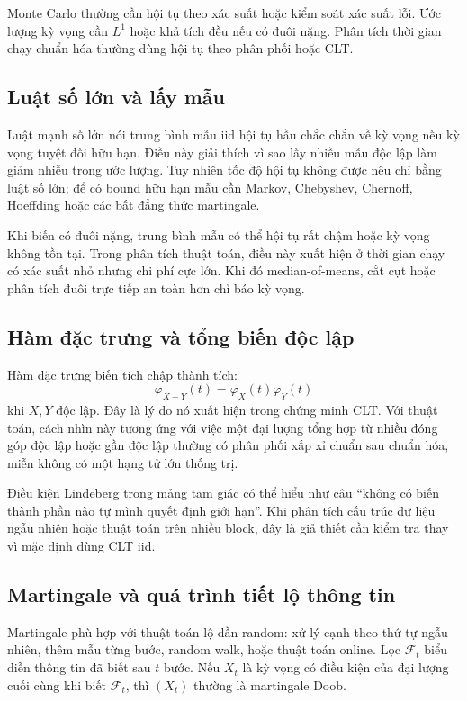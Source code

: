 \documentclass[11pt]{article}
\begin{document}
Monte Carlo thường cần hội tụ theo xác suất hoặc kiểm soát xác suất lỗi. Ước
lượng kỳ vọng cần \(L^1\) hoặc khả tích đều nếu có đuôi nặng. Phân tích thời
gian chạy chuẩn hóa thường dùng hội tụ theo phân phối hoặc CLT.

\subsection{Luật số lớn và lấy mẫu}

Luật mạnh số lớn nói trung bình mẫu iid hội tụ hầu chắc chắn về kỳ vọng nếu
kỳ vọng tuyệt đối hữu hạn. Điều này giải thích vì sao lấy nhiều mẫu độc lập làm
giảm nhiễu trong ước lượng. Tuy nhiên tốc độ hội tụ không được nêu chỉ bằng
luật số lớn; để có bound hữu hạn mẫu cần Markov, Chebyshev, Chernoff, Hoeffding
hoặc các bất đẳng thức martingale.

Khi biến có đuôi nặng, trung bình mẫu có thể hội tụ rất chậm hoặc kỳ vọng không
tồn tại. Trong phân tích thuật toán, điều này xuất hiện ở thời gian chạy có xác
suất nhỏ nhưng chi phí cực lớn. Khi đó median-of-means, cắt cụt hoặc phân tích
đuôi trực tiếp an toàn hơn chỉ báo kỳ vọng.

\subsection{Hàm đặc trưng và tổng biến độc lập}

Hàm đặc trưng biến tích chập thành tích:
\[
  \varphi_{X+Y}(t)=\varphi_X(t)\varphi_Y(t)
\]
khi \(X,Y\) độc lập. Đây là lý do nó xuất hiện trong chứng minh CLT. Với thuật
toán, cách nhìn này tương ứng với việc một đại lượng tổng hợp từ nhiều đóng góp
độc lập hoặc gần độc lập thường có phân phối xấp xỉ chuẩn sau chuẩn hóa, miễn
không có một hạng tử lớn thống trị.

Điều kiện Lindeberg trong mảng tam giác có thể hiểu như câu ``không có biến
thành phần nào tự mình quyết định giới hạn''. Khi phân tích cấu trúc dữ liệu
ngẫu nhiên hoặc thuật toán trên nhiều block, đây là giả thiết cần kiểm tra thay
vì mặc định dùng CLT iid.

\subsection{Martingale và quá trình tiết lộ thông tin}

Martingale phù hợp với thuật toán lộ dần random: xử lý cạnh theo thứ tự ngẫu
nhiên, thêm mẫu từng bước, random walk, hoặc thuật toán online. Lọc
\(\mathcal{F}_t\) biểu diễn thông tin đã biết sau \(t\) bước. Nếu \(X_t\) là kỳ
vọng có điều kiện của đại lượng cuối cùng khi biết \(\mathcal{F}_t\), thì
\((X_t)\) thường là martingale Doob.
\end{document}
